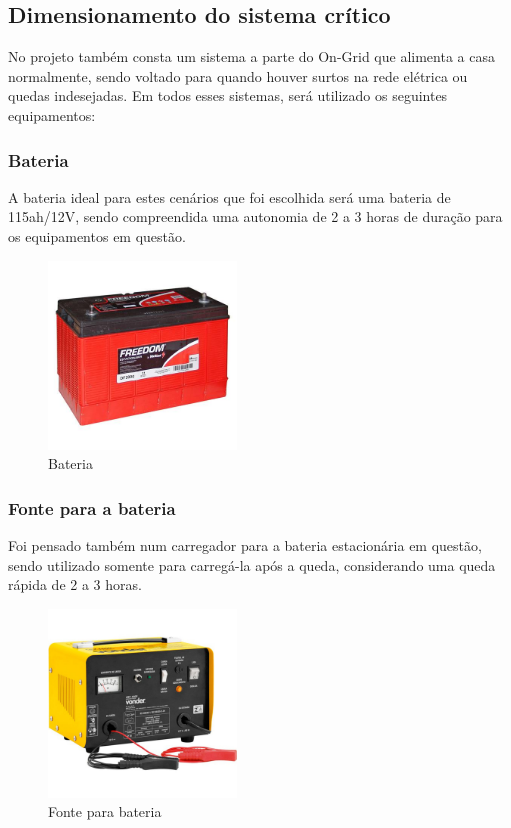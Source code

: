 \subsection{Dimensionamento do sistema crítico}
\par No projeto também consta um sistema a parte do On-Grid que alimenta a casa normalmente, sendo voltado para quando houver surtos na rede elétrica ou quedas indesejadas. Em todos esses sistemas, será utilizado os seguintes equipamentos:

\subsubsection{Bateria}
\par A bateria ideal para estes cenários que foi escolhida será uma bateria de 115ah/12V, sendo compreendida uma autonomia de 2 a 3 horas de duração para os equipamentos em questão.

\begin{figure}[!h]
\centering
\caption{Bateria}
\includegraphics[width=5cm]{figuras/bateria}
\end{figure}

\subsubsection{Fonte para a bateria}
\par Foi pensado também num carregador para a bateria estacionária em questão, sendo utilizado somente para carregá-la após a queda, considerando uma queda rápida de 2 a 3 horas.

\begin{figure}[!h]
\centering
\caption{Fonte para bateria}
\includegraphics[width=5cm]{figuras/fonte}
\end{figure}


